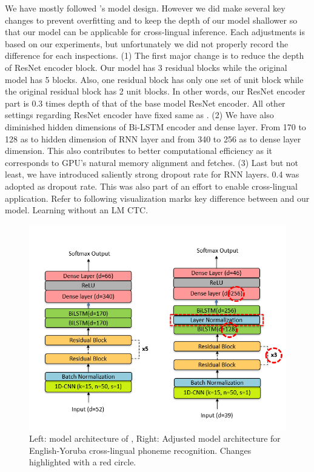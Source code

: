 \documentclass[11pt]{article}
\begin{document}
{We have mostly followed \cite{dhakal2022automatic}'s model design. However we did make several key changes to prevent overfitting and to keep the depth of our model shallower so that our model can be applicable for cross-lingual inference. Each adjustments is based on our experiments, but unfortunately we did not properly record the difference for each inspections. (1) The first major change is to reduce the depth of ResNet encoder block. Our model has 3 residual blocks while the original model has 5 blocks. Also, one residual block has only one set of unit block while the original residual block has 2 unit blocks. In other words, our ResNet encoder part is 0.3 times depth of that of the base model ResNet encoder. All other settings regarding ResNet encoder have fixed same as \cite{dhakal2022automatic}. (2) We have also diminished hidden dimensions of Bi-LSTM encoder and dense layer. From 170 to 128 as to hidden dimension of RNN layer and from 340 to 256 as to dense layer dimension. This also contributes to better computational efficiency as it corresponds to GPU's natural memory alignment and fetches. (3) Last but not least, we have introduced saliently strong dropout rate for RNN layers. 0.4 was adopted as dropout rate. This was also part of an effort to enable cross-lingual application. Refer to following visualization marks key difference between \cite{dhakal2022automatic} and our model.
Learning without an LM CTC. 
\begin{figure}
    \centering
    \includegraphics[width=1\linewidth]{modelarchitecture+.png}
    \caption{Left: model architecture of \cite{dhakal2022automatic} , Right: Adjusted model architecture for English-Yoruba cross-lingual phoneme recognition. Changes highlighted with a red circle.}
    \label{fig:architecture}
\end{figure}


}
\end{document}
